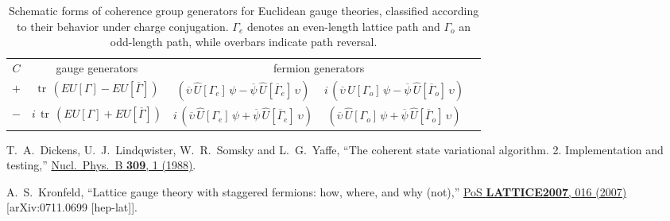 \documentclass [12pt]{article}
\newcommand{\tr}{\mathop{\mathrm{tr}}}
\begin{document}
\begin{table}[t]
\begin{center}
\begin{tabular}{ccccc}
$C$ & gauge generators & \multicolumn{2}{c}{fermion generators}
\\[3pt]
  $+$ & $\tr\, (E U[\Gamma] - E U[\overline\Gamma])$
      & $(\overline \upsilon \, \hat U[\Gamma_e] \, \psi -
	\overline \psi \, \hat U[\overline \Gamma_e] \, \upsilon)$
      & $i\,(\overline \upsilon \, \hat U[\Gamma_o] \, \psi -
	\overline \psi \, \hat U[\overline \Gamma_o] \, \upsilon)$
\\[3pt]
  $-$ & $i \, \tr\, (E U[\Gamma] + E U[\overline\Gamma])$
      & $i\,(\overline \upsilon \, \hat U[\Gamma_e] \, \psi +
	\overline \psi \, \hat U[\overline \Gamma_e] \, \upsilon)$
      & $(\overline \upsilon \, \hat U[\Gamma_o] \, \psi +
	\overline \psi \, \hat U[\overline \Gamma_o] \, \upsilon)$
\end{tabular}
\end{center}
\caption
    {%
    Schematic forms of coherence group generators for Euclidean gauge theories,
    classified according to their behavior under charge conjugation.
    $\Gamma_e$ denotes an even-length lattice path and
    $\Gamma_o$ an odd-length path, while overbars indicate path reversal.
    \label{tab:euclidgens}
    }
\end{table}

\begin{thebibliography}{99}

T.~A.~Dickens, U.~J.~Lindqwister, W.~R.~Somsky and L.~G.~Yaffe,
``The coherent state variational algorithm. 2. Implementation and testing,''
\href{https://doi.org/10.1016/0550-3213(88)90234-9}
{Nucl.~Phys.~B \textbf{309}, 1 (1988)}.

A.~S.~Kronfeld,
``Lattice gauge theory with staggered fermions: how, where, and why (not),''
\href{https://doi:10.22323/1.042.0016}
{PoS \textbf{LATTICE2007}, 016 (2007)}
[arXiv:0711.0699 [hep-lat]].

\end{thebibliography}
\end{document}
